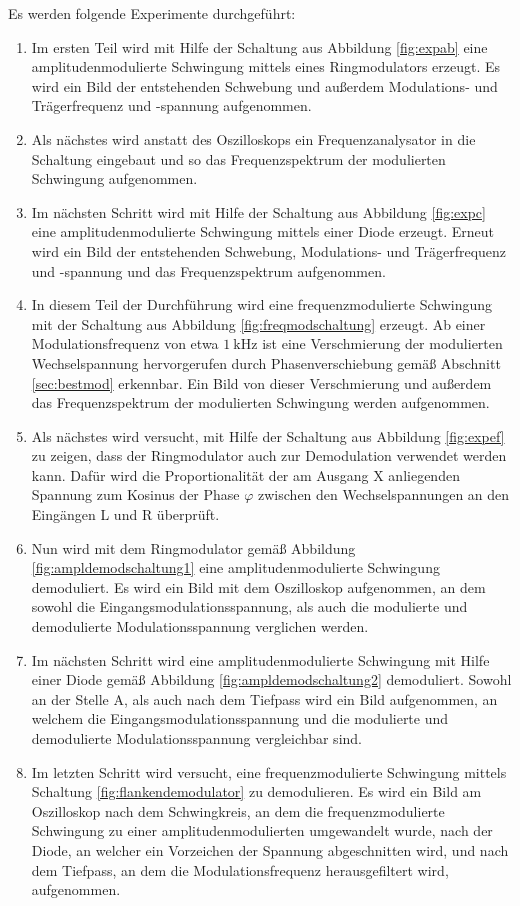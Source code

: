Es werden folgende Experimente durchgeführt:
\begin{enumerate}
  \item Im ersten Teil wird mit Hilfe der Schaltung aus Abbildung \ref{fig:expab} eine
  amplitudenmodulierte Schwingung mittels eines Ringmodulators erzeugt. Es wird ein
  Bild der entstehenden Schwebung und außerdem Modulations- und Trägerfrequenz und -spannung
  aufgenommen.
  \item Als nächstes wird anstatt des Oszilloskops ein Frequenzanalysator in die Schaltung eingebaut
  und so das Frequenzspektrum der modulierten Schwingung aufgenommen.
  \item Im nächsten Schritt wird mit Hilfe der Schaltung aus Abbildung \ref{fig:expc} eine amplitudenmodulierte Schwingung
  mittels einer Diode erzeugt. Erneut wird ein Bild der entstehenden Schwebung, Modulations- und Trägerfrequenz und -spannung und
  das Frequenzspektrum aufgenommen.
  \item In diesem Teil der Durchführung wird eine frequenzmodulierte Schwingung mit der Schaltung aus Abbildung \ref{fig:freqmodschaltung}
  erzeugt. Ab einer Modulationsfrequenz von etwa $\SI{1}{\kilo\hertz}$ ist eine Verschmierung der modulierten Wechselspannung hervorgerufen
  durch Phasenverschiebung gemäß Abschnitt \ref{sec:bestmod} erkennbar. Ein Bild von dieser Verschmierung und außerdem das Frequenzspektrum
  der modulierten Schwingung werden aufgenommen.
  \item Als nächstes wird versucht, mit Hilfe der Schaltung aus Abbildung \ref{fig:expef} zu zeigen, dass der Ringmodulator
  auch zur Demodulation verwendet werden kann. Dafür wird die Proportionalität der am Ausgang X anliegenden Spannung zum
  Kosinus der Phase $\varphi$ zwischen den Wechselspannungen an den Eingängen L und R überprüft.
  \item Nun wird mit dem Ringmodulator gemäß Abbildung \ref{fig:ampldemodschaltung1} eine amplitudenmodulierte Schwingung
  demoduliert. Es wird ein Bild mit dem Oszilloskop aufgenommen, an dem sowohl die Eingangsmodulationsspannung, als auch die
  modulierte und demodulierte Modulationsspannung verglichen werden.
  \item Im nächsten Schritt wird eine amplitudenmodulierte Schwingung mit Hilfe einer Diode gemäß Abbildung \ref{fig:ampldemodschaltung2}
  demoduliert. Sowohl an der Stelle A, als auch nach dem Tiefpass wird ein Bild aufgenommen, an welchem die Eingangsmodulationsspannung und
  die modulierte und demodulierte Modulationsspannung vergleichbar sind.
  \item Im letzten Schritt wird versucht, eine frequenzmodulierte Schwingung mittels Schaltung \ref{fig:flankendemodulator} zu demodulieren.
  Es wird ein Bild am Oszilloskop nach dem Schwingkreis, an dem die frequenzmodulierte Schwingung zu einer amplitudenmodulierten umgewandelt
  wurde, nach der Diode, an welcher ein Vorzeichen der Spannung abgeschnitten wird, und nach dem Tiefpass, an dem die Modulationsfrequenz
  herausgefiltert wird, aufgenommen.
\end{enumerate}

